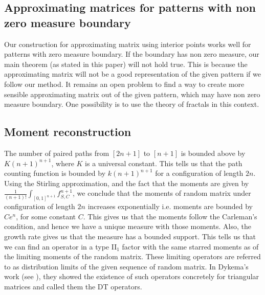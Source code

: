 \documentclass[12pt]{amsart}
\theoremstyle{definition}
\theoremstyle{remark}
\begin{document}
\subsection{Approximating matrices for patterns with non zero measure boundary}

Our construction for approximating matrix using interior points works well for patterns with zero measure boundary. If the boundary has non zero measure, our main theorem (as stated in this paper) will not hold true. This is because the approximating matrix will not be a good representation of the given pattern if we follow our method. It remains an open problem to find a way to create more sensible approximating matrix out of the given pattern, which may have non zero measure boundary. One possibility is to use the theory of fractals in this context.





\subsection{Moment reconstruction}

The number of paired paths from $[2n+1]$ to $[n+1]$ is bounded above by $K(n+1)^{n+1}$, where $K$ is a universal constant. This tells us that the path counting function is bounded by $k(n+1)^{n+1}$ for a configuration of length $2n$. Using the Stirling approximation, and the fact that the moments are given by $\frac{1}{(n+1)!}\int_{[0,1]^{n+1}}f_{S,C}^{n+1}$, we conclude that the moments of random matrix under configuration of length $2n$ increases exponentially i.e. moments are bounded by $Ce^n$, for some constant $C$. This gives us that the moments follow the Carleman's condition, and hence we have a unique measure with those moments. Also, the growth rate gives us that the measure has a bounded support. This tells us that we can find an operator in a type II$_1$ factor with the same starred moments as of the limiting moments of the random matrix. These limiting operators are referred to as distribution limits of the given sequence of random matrix. In Dykema's work (see \cite{dykema}), they showed the existence of such operators concretely for triangular matrices and called them the DT operators. 
\end{document}
